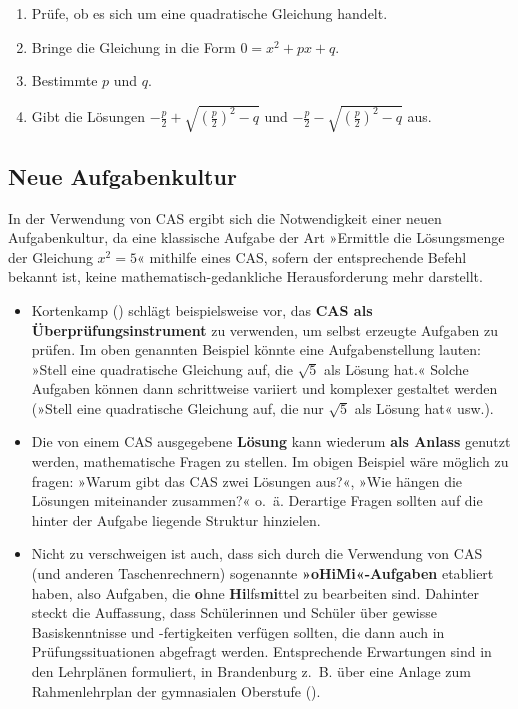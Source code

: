 \documentclass[
]{scrbook}
\providecommand{\tightlist}{%
  \setlength{\itemsep}{0pt}\setlength{\parskip}{0pt}}
\theoremstyle{definition}
\theoremstyle{definition}
\theoremstyle{definition}
\theoremstyle{definition}
\theoremstyle{remark}
\begin{document}
\begin{enumerate}
\def\labelenumi{\arabic{enumi}.}
\tightlist
\item
  Prüfe, ob es sich um eine quadratische Gleichung handelt.
\item
  Bringe die Gleichung in die Form \(0 = x^2+px+q\).
\item
  Bestimmte \(p\) und \(q\).
\item
  Gibt die Lösungen \(-\frac{p}{2}+\sqrt{\left(\frac{p}{2}\right)^2-q}\) und \(-\frac{p}{2}-\sqrt{\left(\frac{p}{2}\right)^2-q}\) aus.
\end{enumerate}

\subsection{Neue Aufgabenkultur}\label{neue-aufgabenkultur}

In der Verwendung von CAS ergibt sich die Notwendigkeit einer neuen Aufgabenkultur, da eine klassische Aufgabe der Art »Ermittle die Lösungsmenge der Gleichung \(x^2 = 5\)« mithilfe eines CAS, sofern der entsprechende Befehl bekannt ist, keine mathematisch-gedankliche Herausforderung mehr darstellt.

\begin{itemize}
\item
  Kortenkamp () schlägt beispielsweise vor, das \textbf{CAS als Überprüfungsinstrument} zu verwenden, um selbst erzeugte Aufgaben zu prüfen. Im oben genannten Beispiel könnte eine Aufgabenstellung lauten: »Stell eine quadratische Gleichung auf, die \(\sqrt{5}\) als Lösung hat.« Solche Aufgaben können dann schrittweise variiert und komplexer gestaltet werden (»Stell eine quadratische Gleichung auf, die nur \(\sqrt{5}\) als Lösung hat« usw.).
\item
  Die von einem CAS ausgegebene \textbf{Lösung} kann wiederum \textbf{als Anlass} genutzt werden, mathematische Fragen zu stellen. Im obigen Beispiel wäre möglich zu fragen: »Warum gibt das CAS zwei Lösungen aus?«, »Wie hängen die Lösungen miteinander zusammen?« o.~ä. Derartige Fragen sollten auf die hinter der Aufgabe liegende Struktur hinzielen.
\item
  Nicht zu verschweigen ist auch, dass sich durch die Verwendung von CAS (und anderen Taschenrechnern) sogenannte \textbf{»oHiMi«-Aufgaben} etabliert haben, also Aufgaben, die \textbf{o}hne \textbf{Hi}lfs\textbf{mi}ttel zu bearbeiten sind. Dahinter steckt die Auffassung, dass Schülerinnen und Schüler über gewisse Basiskenntnisse und -fertigkeiten verfügen sollten, die dann auch in Prüfungssituationen abgefragt werden. Entsprechende Erwartungen sind in den Lehrplänen formuliert, in Brandenburg z.~B. über eine Anlage zum Rahmenlehrplan der gymnasialen Oberstufe ().
\end{itemize}
\end{document}
